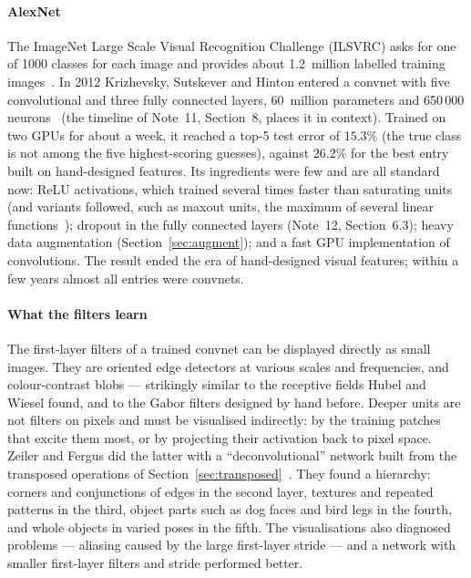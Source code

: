 \documentclass[11pt]{article}
\begin{document}
\paragraph{AlexNet} The ImageNet Large Scale Visual Recognition Challenge (ILSVRC) asks for one of 1000 classes for each
image and provides about 1.2~million labelled training images~\cite{deng2009}. In 2012 Krizhevsky, Sutskever and Hinton
entered a convnet with five convolutional and three fully connected layers, 60~million parameters and 650\,000
neurons~\cite{krizhevsky2012} (the timeline of Note~11, Section~8, places it in context). Trained on two GPUs for about a week, it reached a top-5 test error of $15.3\%$ (the true
class is not among the five highest-scoring guesses), against $26.2\%$ for the best entry built on hand-designed
features. Its ingredients were few and are all standard now: ReLU activations, which trained several times faster than
saturating units (and variants followed, such as maxout units, the maximum of several linear
functions~\cite{goodfellow2013}); dropout in the fully connected layers (Note~12, Section~6.3); heavy data augmentation (Section~\ref{sec:augment}); and
a fast GPU implementation of convolutions. The result ended the era of hand-designed visual features; within a few
years almost all entries were convnets.

\paragraph{What the filters learn} The first-layer filters of a trained convnet can be displayed directly as small
images. They are oriented edge detectors at various scales and frequencies, and colour-contrast blobs --- strikingly
similar to the receptive fields Hubel and Wiesel found, and to the Gabor filters designed by hand before. Deeper units are
not filters on pixels and must be visualised indirectly: by the training patches that excite them most, or by projecting
their activation back to pixel space. Zeiler and Fergus did the latter with a ``deconvolutional'' network built from the
transposed operations of Section~\ref{sec:transposed}~\cite{zeiler2014}. They found a hierarchy: corners and conjunctions of
edges in the second layer, textures and repeated patterns in the third, object parts such as dog faces and bird legs in
the fourth, and whole objects in varied poses in the fifth. The visualisations also diagnosed problems --- aliasing caused by the large first-layer stride --- and a
network with smaller first-layer filters and stride performed better.
\end{document}
